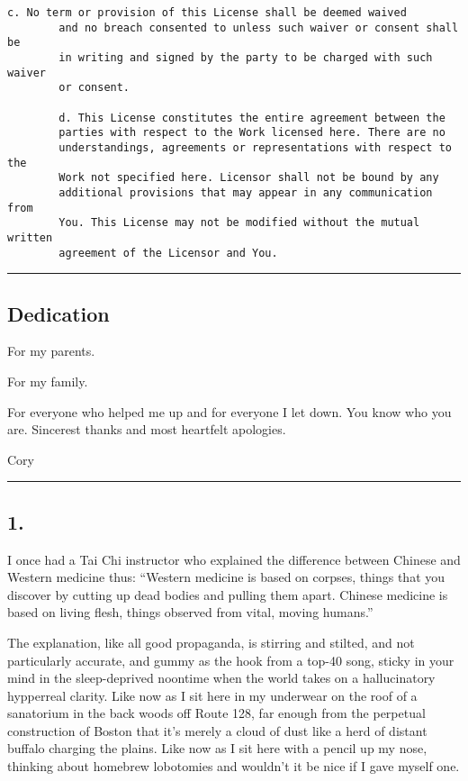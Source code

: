\begin{Verbatim}[fontsize=\footnotesize]
        c. No term or provision of this License shall be deemed waived
        and no breach consented to unless such waiver or consent shall be
        in writing and signed by the party to be charged with such waiver
        or consent.
        
        d. This License constitutes the entire agreement between the
        parties with respect to the Work licensed here. There are no
        understandings, agreements or representations with respect to the
        Work not specified here. Licensor shall not be bound by any
        additional provisions that may appear in any communication from
        You. This License may not be modified without the mutual written
        agreement of the Licensor and You.

\end{Verbatim}
\begin{center}\rule{3in}{0.4pt}\end{center}

\subsection{Dedication}

For my parents.

For my family.

For everyone who helped me up and for everyone I let down. You know
who you are. Sincerest thanks and most heartfelt apologies.

Cory

\begin{center}\rule{3in}{0.4pt}\end{center}

\subsection{1.}

I once had a Tai Chi instructor who explained the difference
between Chinese and Western medicine thus: “Western medicine is
based on corpses, things that you discover by cutting up dead
bodies and pulling them apart. Chinese medicine is based on living
flesh, things observed from vital, moving humans.”

The explanation, like all good propaganda, is stirring and stilted,
and not particularly accurate, and gummy as the hook from a top-40
song, sticky in your mind in the sleep-deprived noontime when the
world takes on a hallucinatory hypperreal clarity. Like now as I
sit here in my underwear on the roof of a sanatorium in the back
woods off Route 128, far enough from the perpetual construction of
Boston that it’s merely a cloud of dust like a herd of distant
buffalo charging the plains. Like now as I sit here with a pencil
up my nose, thinking about homebrew lobotomies and wouldn’t it be
nice if I gave myself one.


